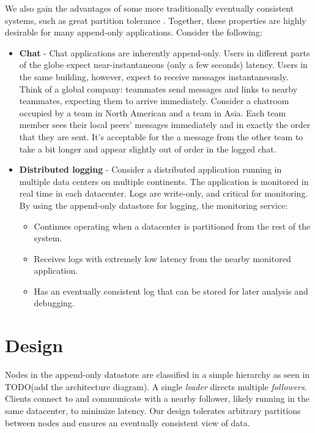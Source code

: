 \documentclass[11pt,english,twocolumn]{article}
\begin{document}
We also gain the advantages of some more traditionally eventually consistent
systems, such as great partition tolerance \cite{Dynamo}. Together, these
properties are highly desirable for many append-only applications. Consider the
following:

\begin{itemize}
	\item \textbf{Chat} - Chat applications are inherently append-only. Users
		in different parts of the globe expect near-instantaneous (only
		a few seconds) latency. Users in the same building, however,
		expect to receive messages instantaneously. Think of a global
		company: teammates send messages and links to nearby teammates,
		expecting them to arrive immediately. Consider a chatroom
		occupied by a team in North American and a team in Asia. Each
		team member sees their local peers' messages immediately and in
		exactly the order that they are sent. It's acceptable for the a
		message from the other team to take a bit longer and appear
		slightly out of order in the logged chat.
	\item \textbf{Distributed logging} - Consider a distributed application
		running in multiple data centers on multiple continents. The
		application is monitored in real time in each datacenter. Logs
		are write-only, and critical for monitoring. By using the
		append-only datastore for logging, the monitoring service:
		\begin{itemize}
			\item Continues operating when a datacenter is
				partitioned from the rest of the system.
			\item Receives logs with extremely low latency from the
				nearby monitored application.
			\item Has an eventually consistent log that can be
				stored for later analysis and debugging.
		\end{itemize}
\end{itemize}

\section{Design}
Nodes in the append-only datastore are classified in a simple hierarchy as seen
in TODO(add the architecture diagram). A single \textit{leader} directs multiple
\textit{followers}. Clients connect to and communicate with a nearby follower,
likely running in the same datacenter, to minimize latency. Our design tolerates
arbitrary partitions between nodes and ensures an eventually consistent view of
data.
\end{document}
